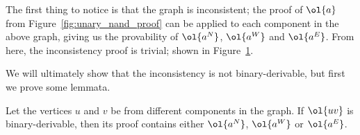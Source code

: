 The first thing to notice is that the graph is inconsistent;
the proof of $\ol{a}$ from Figure~\ref{fig:unary_nand_proof} can be applied to each component in the above graph, giving us the provability of $\ol{a^N}$, $\ol{a^W}$ and $\ol{a^E}$.
From here, the inconsistency proof is trivial;
shown in Figure~\ref{fig:triple_double_open_door_proof}.\par
\begin{figure}[!h]
  \centering
  \begin{prooftree*}
    \Hypo{\dots}
    \Hypo{\dots}
    \Hypo{\dots}
  \end{prooftree*}
  \caption{}
  \label{fig:triple_double_open_door_proof}
\end{figure}
We will ultimately show that the inconsistency is not binary-derivable, but first we prove some lemmata.
\begin{lemma}
  Let the vertices $u$ and $v$ be from different components in the graph.
  If $\ol{uv}$ is binary-derivable, then its proof contains either $\ol{a^N}$, $\ol{a^W}$ or $\ol{a^E}$.
  \label{thm:uv_proof_contains_a}
\end{lemma}
